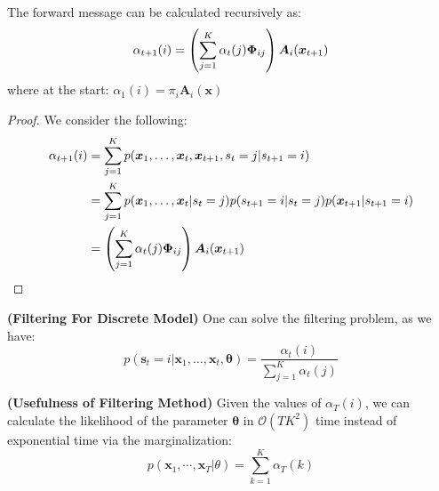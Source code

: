 \begin{proposition}
    The forward message can be calculated recursively as:
        \begin{equation*}
            \alpha_{t+1}(i) = \left( \sum^K_{j=1}\alpha_t(j) \boldsymbol \Phi_{ij} \right)\boldsymbol A_i(\boldsymbol x_{t+1})
        \end{equation*}
    where at the start: $\alpha_1(i) = \pi_i\boldsymbol A_i(\boldsymbol x)$
\end{proposition}
\begin{proof}
    We consider the following:
    \begin{equation*}
    \begin{aligned}
        \alpha_{t+1}(i) 
        &= \sum^K_{j=1}p(\boldsymbol x_1, \dots, \boldsymbol x_t, \boldsymbol x_{t+1}, s_t = j | s_{t+1} = i) \\
        &= \sum^K_{j=1}p(\boldsymbol x_1, \dots, \boldsymbol x_t| s_t = j)p(s_{t+1} = i | s_t = j)p(\boldsymbol x_{t+1} | s_{t+1} = i) \\
        &= \left( \sum^K_{j=1}\alpha_t(j) \boldsymbol \Phi_{ij} \right)\boldsymbol A_i(\boldsymbol x_{t+1})
    \end{aligned}
    \end{equation*}
\end{proof}

\begin{remark}{\textbf{(Filtering For Discrete Model)}}
    One can solve the filtering problem, as we have:
    \begin{equation*}
        p(\boldsymbol s_t = i | \boldsymbol x_1,\dots,\boldsymbol x_t, \boldsymbol \theta) = \frac{\alpha_t(i)}{\sum^K_{j=1}\alpha_t(j)}
    \end{equation*}
\end{remark}

\begin{remark}{\textbf{(Usefulness of Filtering Method)}}
    Given the values of $\alpha_T(i)$, we can calculate the likelihood of the parameter $\boldsymbol \theta$ in $\mathcal{O}(TK^2)$ time instead of exponential time via the marginalization:
    \begin{equation*}
        p(\boldsymbol x_1,\cdots, \boldsymbol x_T|\theta) = \sum^K_{k=1}\alpha_T(k)
    \end{equation*}
\end{remark}

